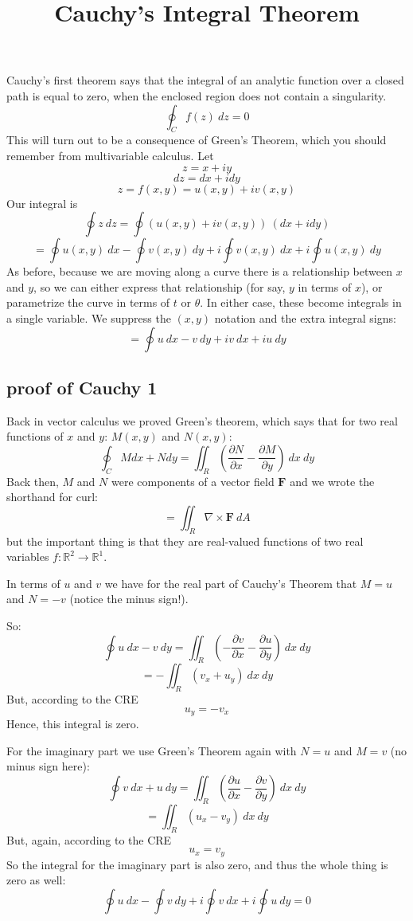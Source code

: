 \documentclass[11pt, oneside]{article}   	%
\title{Cauchy's Integral Theorem}
\date{}							%
\begin{document}
\maketitle
\Large
Cauchy's first theorem says that the integral of an analytic function over a closed path is equal to zero, when the enclosed region does not contain a singularity.
\[ \oint_C f(z) \ dz = 0 \]
This will turn out to be a consequence of Green's Theorem, which you should remember from multivariable calculus.  Let
\[ z = x + i y \]
\[ dz = dx + i dy \]
\[ z = f(x,y) = u(x,y) + iv(x,y) \]
Our integral is
\[ \oint z \ dz = \oint (u(x,y) + iv(x,y)) \ (dx + i dy) \]
\[ =  \oint u(x,y) \ dx - \oint v(x,y) \ dy + i \oint v(x,y) \ dx + i \oint u(x,y) \ dy \]
As before, because we are moving along a curve there is a relationship between $x$ and $y$, so we can either express that relationship (for say, $y$ in terms of $x$), or parametrize the curve in terms of $t$ or $\theta$.  In either case, these become integrals in a single variable.  We suppress the $(x,y)$ notation and the extra integral signs:
\[ =  \oint u \ dx - v \ dy + i v \ dx + i u \ dy \]

\subsection*{proof of Cauchy 1}
Back in vector calculus we proved Green's theorem, which says that for two real functions of $x$ and $y$:  $M(x,y)$ and $N(x,y)$:
\[ \oint_C M dx + N dy = \iint_R (\frac{\partial N}{\partial x} - \frac{\partial M}{\partial y}) \ dx \ dy \]
Back then, $M$ and $N$ were components of a vector field $\mathbf{F}$ and we wrote the shorthand for curl:
\[ = \iint_R \nabla \times \mathbf{F} \ dA\]
but the important thing is that they are real-valued functions of two real variables $f: \mathbb{R}^2 \rightarrow \mathbb{R}^1$.

In terms of $u$ and $v$ we have for the real part of Cauchy's Theorem that $M=u$ and $N = -v$ (notice the minus sign!).  

So:
\[ \oint u \ dx - v \ dy = \iint_R (-\frac{\partial v}{\partial x} -  \frac{\partial u}{\partial y}) \ dx \ dy \]
\[ = - \iint_R (v_x + u_y) \ dx \ dy \]
But, according to the CRE
\[ u_y = -v_x \]
Hence, this integral is zero.

For the imaginary part we use Green's Theorem again with $N=u$ and $M = v$ (no minus sign here):
\[ \oint v \ dx + u \ dy =  \iint_R (\frac{\partial u}{\partial x} - \frac{\partial v}{\partial y}) \ dx \ dy \]
\[ =  \iint_R (u_x - v_y) \ dx \ dy \]
But, again, according to the CRE
\[ u_x = v_y \]
So the integral for the imaginary part is also zero, and thus the whole thing is zero as well:
\[ \oint u \ dx - \oint v \ dy + i \oint v \ dx + i \oint u \ dy = 0 \]
\end{document}

